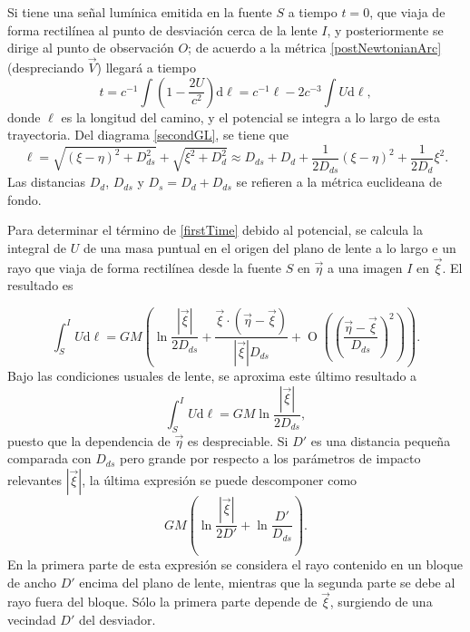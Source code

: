 Si tiene una señal lumínica emitida en la fuente $S$ a tiempo $t=0$, que viaja de forma rectilínea al punto de desviación cerca de la lente $I$, y posteriormente se dirige al punto de observación $O$; de acuerdo a la métrica \eqref{postNewtonianArc} (despreciando $\vec{V}$) llegará a tiempo
\begin{equation}\label{firstTime}
t = c^{-1}\int \left( 1-\frac{2U}{c^2}\right)\mathrm{d}\ell = c^{-1} \ell - 2c^{-3}\int U\mathrm{d}\ell,
\end{equation}
donde $\ell$ es la longitud del camino, y el potencial se integra a lo largo de esta trayectoria. Del diagrama \ref{secondGL}, se tiene que
\begin{equation}
\ell=\sqrt{(\xi-\eta)^2 +D_{ds}^2}+\sqrt{\xi^2+D_d^2}\approx D_{ds}+D_d+\frac{1}{2D_{ds}}(\xi-\eta)^2+\frac{1}{2D_d}\xi^2.
\end{equation}
Las distancias $D_d$, $D_{ds}$ y $D_s=D_d+D_{ds}$ se refieren a la métrica euclideana de fondo.

Para determinar el término de \eqref{firstTime} debido al potencial, se calcula la integral de $U$ de una masa puntual en el origen del plano de lente a lo largo e un rayo que viaja de forma rectilínea desde la fuente $S$ en $\vec{\eta}$ a una imagen $I$ en $\vec{\xi}$. El resultado es

\begin{equation}
\int_S^I U\mathrm{d}\ell = GM\left(\mathop{ln} \frac{|\vec{\xi}|}{2D_{ds}}+\frac{\vec{\xi}\cdot(\vec{\eta}-\vec{\xi})}{|\vec{\xi}|D_{ds}}+\mathop{O}\left( \left(\frac{\vec{\eta}-\vec{\xi}}{D_{ds}} \right)^2 \right) \right).
\end{equation}
Bajo las condiciones usuales de lente, se aproxima este último resultado a
\begin{equation}
\int_S^I U \mathrm{d}\ell = GM\mathop{ln} \frac{|\vec{\xi}|}{2D_{ds}},
\end{equation}
puesto que la dependencia de $\vec{\eta}$ es despreciable. Si $D'$ es una distancia pequeña comparada con $D_{ds}$ pero grande por respecto a los parámetros de impacto relevantes $|\vec{\xi}|$, la última expresión se puede descomponer como
\begin{equation}\label{descomposed}
	GM\left( \mathop{ln} \frac{|\vec{\xi}|}{2D'}+\mathop{ln}\frac{D'}{D_{ds}} \right).
\end{equation}
En la primera parte de esta expresión se considera el rayo contenido en un bloque de ancho $D'$ encima del plano de lente, mientras que la segunda parte se debe al rayo fuera del bloque. Sólo la primera parte depende de $\vec{\xi}$, surgiendo de una vecindad $D'$ del desviador.


